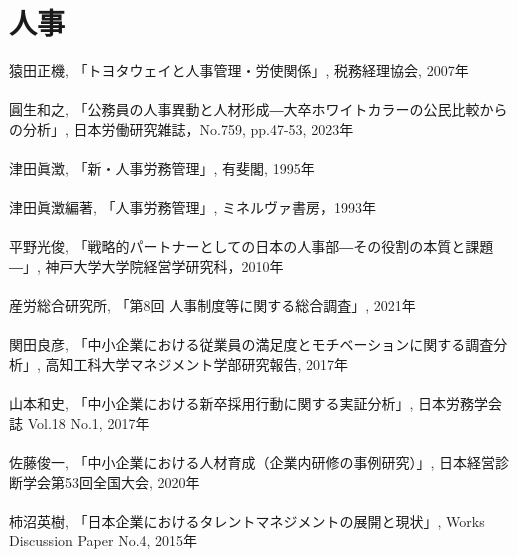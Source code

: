 \section*{人事}
猿田正機, 「トヨタウェイと人事管理・労使関係」, 税務経理協会, 2007年
\\\\
圓生和之, 「公務員の人事異動と人材形成―大卒ホワイトカラーの公民比較からの分析」, 日本労働研究雑誌，No.759, pp.47-53, 2023年
\\\\
津田眞澂, 「新・人事労務管理」, 有斐閣, 1995年
\\\\
津田眞澂編著, 「人事労務管理」, ミネルヴァ書房，1993年
\\\\
平野光俊, 「戦略的パートナーとしての日本の人事部―その役割の本質と課題―」, 神戸大学大学院経営学研究科，2010年
\\\\
産労総合研究所, 「第8回 人事制度等に関する総合調査」, 2021年
\\\\
関田良彦, 「中小企業における従業員の満足度とモチベーションに関する調査分析」, 高知工科大学マネジメント学部研究報告, 2017年
\\\\
山本和史, 「中小企業における新卒採用行動に関する実証分析」, 日本労務学会誌 Vol.18 No.1, 2017年
\\\\
佐藤俊一, 「中小企業における人材育成（企業内研修の事例研究）」, 日本経営診断学会第53回全国大会, 2020年
\\\\
柿沼英樹, 「日本企業におけるタレントマネジメントの展開と現状」, Works Discussion Paper No.4, 2015年

\clearpage
